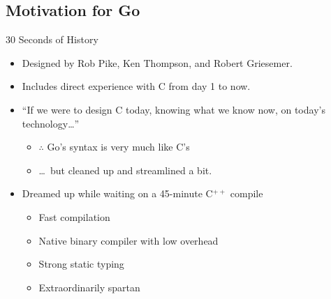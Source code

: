\documentclass[pdf]{beamer}
\begin{document}
\subsection{Motivation for Go}
\begin{frame}{30 Seconds of History}
	\begin{itemize}
		\item Designed by Rob Pike, Ken Thompson, and Robert Griesemer.
		\item Includes direct experience with C from day 1 to now.
			\pause
		\item ``If we were to design C today, knowing what we know now, on today's technology\dots''
			\pause
			\begin{itemize}
		\item $\therefore$ Go's syntax is very much like C's
		\item \dots\ but cleaned up and streamlined a bit.
			\end{itemize}
		\pause
	\item Dreamed up while waiting on a 45-minute C$^{++}$ compile
		\pause
			\begin{itemize}
				\item Fast compilation
				\item Native binary compiler with low overhead
				\item Strong static typing
				\item Extraordinarily spartan
			\end{itemize}
	\end{itemize}
\end{frame}
\end{document}
